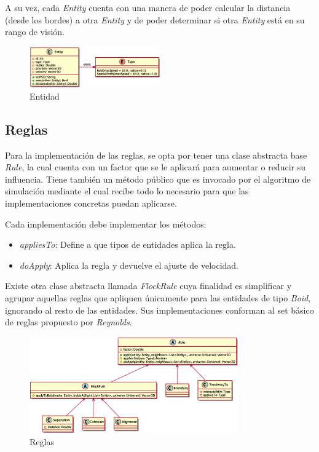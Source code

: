 \documentclass[a4paper]{article}
\begin{document}
            A su vez, cada \textit{Entity} cuenta con una manera de poder calcular la distancia (desde los bordes) a otra \textit{Entity} y de poder determinar si otra \textit{Entity} está en su rango de visión.

            \begin{figure}[H]
                \centering
                \includegraphics[width=0.5\textwidth]{../imgs/entity}
                \caption{Entidad}
                \label{fig:entity_implementation}
            \end{figure}

        \subsection{Reglas}
            Para la implementación de las reglas, se opta por tener una clase abstracta base \textit{Rule}, la cual cuenta con un factor que se le aplicará para aumentar o reducir su influencia. Tiene también un método público que es invocado por el algoritmo de simulación mediante el cual recibe todo lo necesario para que las implementaciones concretas puedan aplicarse.

            Cada implementación debe implementar los métodos:
            \begin{itemize}
                \item \textit{appliesTo}: Define a que tipos de entidades aplica la regla.
                \item \textit{doApply}: Aplica la regla y devuelve el ajuste de velocidad.
            \end{itemize}

            Existe otra clase abstracta llamada \textit{FlockRule} cuya finalidad es simplificar y agrupar aquellas reglas que apliquen únicamente para las entidades de tipo \textit{Boid}, ignorando al resto de las entidades. Sus implementaciones conforman al set básico de reglas propuesto por \textit{Reynolds}.
            \begin{figure}[H]
                \centering
                \includegraphics[width=0.8\textwidth]{../imgs/rules}
                \caption{Reglas}
                \label{fig:rules_implementation}
            \end{figure}
        \pagebreak
\end{document}
